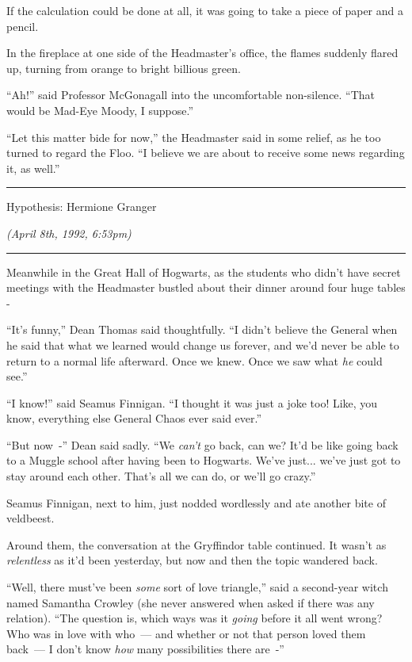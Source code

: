 If the calculation could be done at all, it was going to take a piece of paper and a pencil.

In the fireplace at one side of the Headmaster's office, the flames suddenly flared up, turning from orange to bright billious green.

``Ah!'' said Professor McGonagall into the uncomfortable non-silence. ``That would be Mad-Eye Moody, I suppose.''

``Let this matter bide for now,'' the Headmaster said in some relief, as he too turned to regard the Floo. ``I believe we are about to receive some news regarding it, as well.''

\begin{center}\rule{3in}{0.4pt}\end{center}

Hypothesis: Hermione Granger

\emph{(April 8th, 1992, 6:53pm)}

\begin{center}\rule{3in}{0.4pt}\end{center}

Meanwhile in the Great Hall of Hogwarts, as the students who didn't have secret meetings with the Headmaster bustled about their dinner around four huge tables -

``It's funny,'' Dean Thomas said thoughtfully. ``I didn't believe the General when he said that what we learned would change us forever, and we'd never be able to return to a normal life afterward. Once we knew. Once we saw what \emph{he} could see.''

``I know!'' said Seamus Finnigan. ``I thought it was just a joke too! Like, you know, everything else General Chaos ever said ever.''

``But now~-'' Dean said sadly. ``We \emph{can't} go back, can we? It'd be like going back to a Muggle school after having been to Hogwarts. We've just... we've just got to stay around each other. That's all we can do, or we'll go crazy.''

Seamus Finnigan, next to him, just nodded wordlessly and ate another bite of veldbeest.

Around them, the conversation at the Gryffindor table continued. It wasn't as \emph{relentless} as it'd been yesterday, but now and then the topic wandered back.

``Well, there must've been \emph{some} sort of love triangle,'' said a second-year witch named Samantha Crowley (she never answered when asked if there was any relation). ``The question is, which ways was it \emph{going} before it all went wrong? Who was in love with who~--- and whether or not that person loved them back~--- I don't know \emph{how} many possibilities there are~-''

